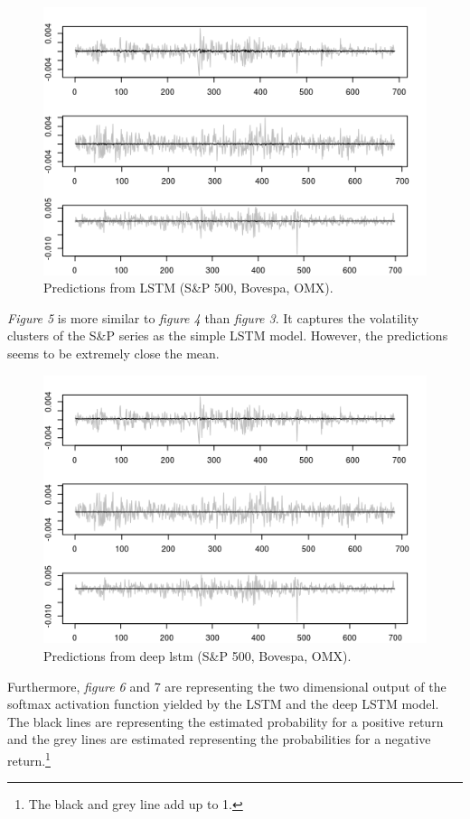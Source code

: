 \documentclass[12pt, letterpaper]{amsart}%
\begin{document}
\begin{figure}%
\caption{Predictions from LSTM (S\&P 500, Bovespa, OMX).}
\centering
\includegraphics[scale=1]{lstm_pred2.png}
\end{figure}

\textit{Figure 5} is more similar to \textit{figure 4} than \textit{figure 3}. It captures the volatility clusters of the S\&P series as the simple LSTM model. However, the predictions seems to be extremely close the mean.
\\

\begin{figure}%
\caption{Predictions from deep lstm (S\&P 500, Bovespa, OMX).}
\centering
\includegraphics[scale=1]{lstm_deep_pred2.png}
\end{figure}

Furthermore, \textit{figure 6} and 7 are representing the two dimensional output of the softmax activation function yielded by the LSTM and the deep LSTM model. The black lines are representing the estimated probability for a positive return and the grey lines are estimated representing the probabilities for a negative return.\footnote{The black and grey line add up to 1.}
\\
\end{document}
